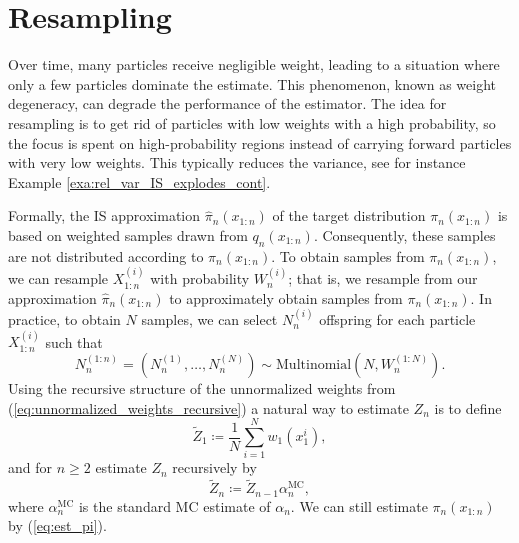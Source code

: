 


\section{Resampling}
Over time, many particles receive negligible weight, leading to a situation where only a few particles dominate the estimate. This phenomenon, known as weight degeneracy, can degrade the performance of the estimator.
The idea for resampling is to get rid of particles with low weights with a high probability, so the focus is spent on high-probability regions instead of carrying forward particles with very low weights. This typically reduces the variance, see for instance Example \ref{exa:rel_var_IS_explodes_cont}. 

Formally, the IS approximation $\widehat{\pi}_n(x_{1:n})$ of the target distribution $\pi_n(x_{1:n})$ is based on weighted samples drawn from $q_n(x_{1:n})$. Consequently, these samples are not distributed according to  $\pi_n(x_{1:n})$. To obtain samples from $\pi_n(x_{1:n})$, we can resample $X_{1:n}^{(i)}$ with probability $W_n^{(i)}$; that is, we resample from our approximation $\widehat{\pi}_n(x_{1:n})$ to approximately obtain samples from $\pi_n(x_{1:n})$. In practice, to obtain $N$ samples, we can select $N_n^{(i)}$ offspring for each particle $X_{1:n}^{(i)}$ such that 
\[
	N_n^{(1:n)}=(N_n^{(1)},\dots, N_n^{(N)}) \sim \text{Multinomial}(N, W_n^{(1:N)}).
\]
Using the recursive structure of the unnormalized weights from (\ref{eq:unnormalized_weights_recursive}) a natural way to estimate 
$Z_n$ is to define 
\[
	\widetilde{Z}_1\coloneq \frac{1}{N}\sum_{i=1}^N w_1(x_1^{i}),
\]
and for $n\geq 2$ estimate $Z_n$ recursively by 
\begin{equation}
	\widetilde{Z}_n \coloneq\widetilde{Z}_{n-1}{\alpha}_n^{\text{MC}}, \label{eq:est_Z_SIS}
\end{equation}
where ${\alpha}_n^{\text{MC}}$ is the standard MC estimate of $\alpha_n$. We can still estimate $\pi_n(x_{1:n})$ by (\ref{eq:est_pi}). 

